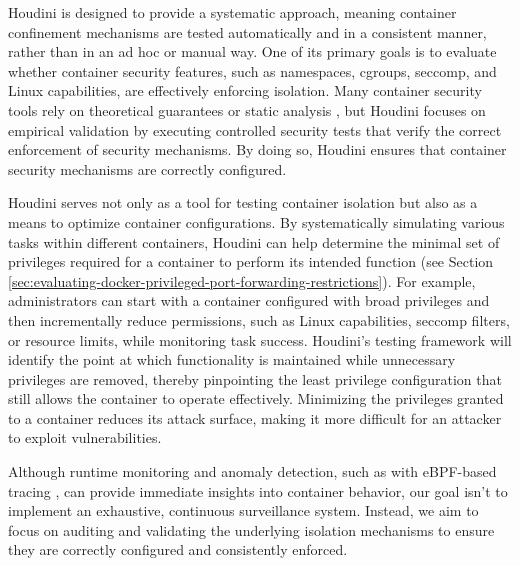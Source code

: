 \begin{doublespace}
Houdini is designed to provide a systematic approach, meaning container confinement mechanisms are tested automatically and in a consistent manner, rather than in an ad hoc or manual way. One of its primary goals is to evaluate whether container security features, such as namespaces, cgroups, \gls{seccomp}, and \gls{Linux capabilities}, are effectively enforcing isolation. Many container security tools rely on theoretical guarantees or static analysis \cite{clair}, but Houdini focuses on empirical validation by executing controlled security tests that verify the correct enforcement of security mechanisms. By doing so, Houdini ensures that container security mechanisms are correctly configured.

Houdini serves not only as a tool for testing container isolation but also as a means to optimize container configurations. By systematically simulating various tasks within different containers, Houdini can help determine the minimal set of privileges required for a container to perform its intended function (see Section \ref{sec:evaluating-docker-privileged-port-forwarding-restrictions}). For example, administrators can start with a container configured with broad privileges and then incrementally reduce permissions, such as Linux capabilities, seccomp filters, or resource limits, while monitoring task success. Houdini's testing framework will identify the point at which functionality is maintained while unnecessary privileges are removed, thereby pinpointing the least privilege configuration that still allows the container to operate effectively. Minimizing the privileges granted to a container reduces its attack surface, making it more difficult for an attacker to exploit vulnerabilities.

Although runtime monitoring and anomaly detection, such as with eBPF-based tracing \cite{findlay2021bpfcontain}, can provide immediate insights into container behavior, our goal isn't to implement an exhaustive, continuous surveillance system. Instead, we aim to focus on auditing and validating the underlying isolation mechanisms to ensure they are correctly configured and consistently enforced.


\end{doublespace}
